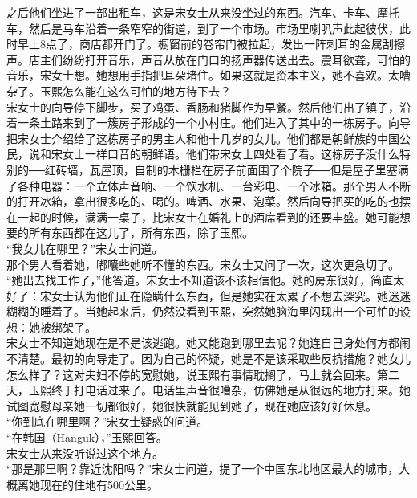 之后他们坐进了一部出租车，这是宋女士从来没坐过的东西。汽车、卡车、摩托车，然后是马车沿着一条窄窄的街道，到了一个市场。市场里喇叭声此起彼伏，此时早上8点了，商店都开门了。橱窗前的卷帘门被拉起，发出一阵刺耳的金属刮擦声。店主们纷纷打开音乐，声音从放在门口的扬声器传送出去。震耳欲聋，可怕的音乐，宋女士想。她想用手指把耳朵堵住。如果这就是资本主义，她不喜欢。太嘈杂了。玉熙怎么能在这么可怕的地方待下去？\\

宋女士的向导停下脚步，买了鸡蛋、香肠和猪脚作为早餐。然后他们出了镇子，沿着一条土路来到了一簇房子形成的一个小村庄。他们进入了其中的一栋房子。向导把宋女士介绍给了这栋房子的男主人和他十几岁的女儿。他们都是朝鲜族的中国公民，说和宋女士一样口音的朝鲜语。他们带宋女士四处看了看。这栋房子没什么特别的──红砖墙，瓦屋顶，自制的木栅栏在房子前面围了个院子──但是屋子里塞满了各种电器：一个立体声音响、一个饮水机、一台彩电、一个冰箱。那个男人不断的打开冰箱，拿出很多吃的、喝的。啤酒、水果、泡菜。然后向导把买的吃的也摆在一起的时候，满满一桌子，比宋女士在婚礼上的酒席看到的还要丰盛。她可能想要的所有东西都在这儿了，所有东西，除了玉熙。\\

“我女儿在哪里？”宋女士问道。\\

那个男人看着她，嘟囔些她听不懂的东西。宋女士又问了一次，这次更急切了。\\

“她出去找工作了，”他答道。宋女士不知道该不该相信他。她的房东很好，简直太好了：宋女士认为他们正在隐瞒什么东西，但是她实在太累了不想去深究。她迷迷糊糊的睡着了。当她起来后，仍然没看到玉熙，突然她脑海里闪现出一个可怕的设想：她被绑架了。\\

宋女士不知道她现在是不是该逃跑。她又能跑到哪里去呢？她连自己身处何方都闹不清楚。最初的向导走了。因为自己的怀疑，她是不是该采取些反抗措施？她女儿怎么样了？这对夫妇不停的宽慰她，说玉熙有事情耽搁了，马上就会回来。第二天，玉熙终于打电话过来了。电话里声音很嘈杂，仿佛她是从很远的地方打来。她试图宽慰母亲她一切都很好，她很快就能见到她了，现在她应该好好休息。\\

“你到底在哪里啊？”宋女士疑惑的问道。\\

“在韩国（Hanguk），”玉熙回答。\\

宋女士从来没听说过这个地方。\\

“那是那里啊？靠近沈阳吗？”宋女士问道，提了一个中国东北地区最大的城市，大概离她现在的住地有500公里。\\

